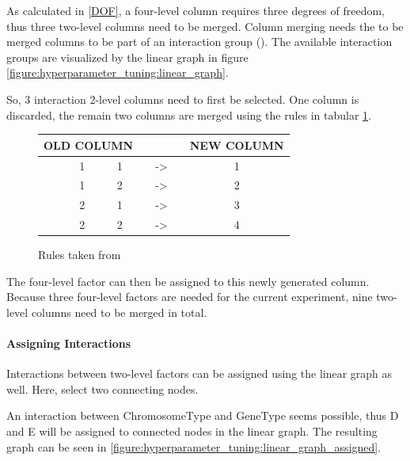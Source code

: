 As calculated in \ref{DOF}, a four-level column requires three degrees of freedom, thus three two-level columns need to be merged. Column merging needs the to be merged columns to be part of an interaction group (\cite{yang_design_2009}). The available interaction groups are visualized by the linear graph in figure \ref{figure:hyperparameter_tuning:linear_graph}.

So, 3 interaction 2-level columns need to first be selected. One column is discarded, the remain two columns are merged using the rules in tabular \ref{table:hyperparameter_tuning:merging_rules}.

\begin{figure}[ht]
	\centering
	\begin{tabular}{ |ccccccc|  }
		\hline
		\multicolumn{3}{|c}{ OLD COLUMN } & & & & NEW COLUMN \\
		\hline
		& 1 & 1 & & -> & & 1\\
		& 1 & 2 & & -> & & 2\\
		& 2 & 1 & & -> & & 3\\
		& 2 & 2 & & -> & & 4\\
		\hline
	\end{tabular}
	\caption{Rules taken from \cite{roy_primer_1990}}
	\label{table:hyperparameter_tuning:merging_rules}
\end{figure}

The four-level factor can then be assigned to this newly generated column. Because three four-level factors are needed for the current experiment, nine two-level columns need to be merged in total.

\paragraph{Assigning Interactions}
Interactions between two-level factors can be assigned using the linear graph as well. Here, select two connecting nodes. 

An interaction between ChromosomeType and GeneType seems possible, thus D and E will be assigned to connected nodes in the linear graph. The resulting graph can be seen in \ref{figure:hyperparameter_tuning:linear_graph_assigned}.


